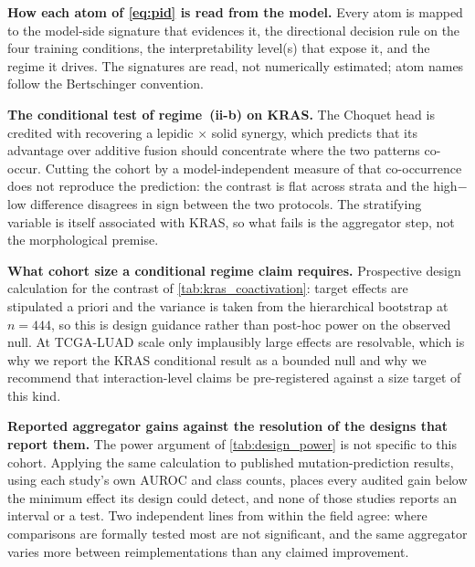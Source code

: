 \begin{table}[htbp]
\centering

\caption{\textbf{How each atom of \cref{eq:pid} is read from the model.}
Every atom is mapped to the model-side signature that evidences it, the
directional decision rule on the four training conditions, the
interpretability level(s) that expose it, and the regime it drives. The
signatures are read, not numerically estimated; atom names follow the
Bertschinger convention.\cite{bertschinger2014unique}}
\label{tab:atom_operationalization}
\end{table}

\begin{table}[htbp]
\centering

\caption{\textbf{The conditional test of regime~(ii-b) on KRAS.} The
Choquet head is credited with recovering a lepidic$\,\times\,$solid
synergy, which predicts that its advantage over additive fusion should
concentrate where the two patterns co-occur. Cutting the cohort by a
model-independent measure of that co-occurrence does not reproduce the
prediction: the contrast is flat across strata and the high${-}$low
difference disagrees in sign between the two protocols. The stratifying variable is
itself associated with KRAS, so what fails is the aggregator step, not
the morphological premise.}
\label{tab:kras_coactivation}
\end{table}

\begin{table}[htbp]
\centering

\caption{\textbf{What cohort size a conditional regime claim requires.}
Prospective design calculation for the contrast of
\cref{tab:kras_coactivation}: target effects are stipulated a priori and
the variance is taken from the hierarchical bootstrap at $n\!=\!444$, so
this is design guidance rather than post-hoc power on the observed null.
At TCGA-LUAD scale only implausibly large effects are resolvable, which
is why we report the KRAS conditional result as a bounded null and why
we recommend that interaction-level claims be pre-registered against a
size target of this kind.}
\label{tab:design_power}
\end{table}

\begin{table}[htbp]
\centering

\caption{\textbf{Reported aggregator gains against the resolution of the
designs that report them.} The power argument of
\cref{tab:design_power} is not specific to this cohort. Applying the same
calculation to published mutation-prediction results, using each study's own
AUROC and class counts, places every audited gain below the minimum effect
its design could detect, and none of those studies reports an interval or a
test. Two independent lines from within the field agree: where comparisons
are formally tested most are not significant, and the same aggregator varies
more between reimplementations than any claimed improvement.}
\label{tab:literature_power_audit}
\end{table}


